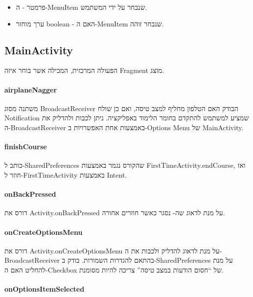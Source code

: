 \begin{itemize}
  \item פרמטר  - ה-MenuItem שנבחר על ידי המשתמש.
  \item ערך מוחזר boolean - האם ה-MenuItem שנבחר זוהה.
\end{itemize}

\subsection*{MainActivity}

הפעולה המרכזית, המכילה  אשר בוחר איזה Fragment מוצג.

\paragraph{airplaneNagger}

משתנה מסוג BroadcastReceiver הבודק האם הטלפון מחליף למצב טיסה,
ואם כן שולח Notification שמציע למשתמש להתקדם בחומר הלימוד באפליקציה.
ניתן לכבות ולהדליק את ה-BroadcastReceiver באמצעות אחת האפשרויות ב-Options Menu של MainActivity.

\paragraph{finishCourse}

כותב ל-SharedPreferences שהקורס נגמר באמצעות FirstTimeActivity.endCourse,
ואז חוזר ל-FirstTimeActivity באמצעות Intent.

\paragraph{onBackPressed}

דורס את Activity.onBackPressed על מנת לדאוג שה- נסגר כאשר חוזרים אחורה.

\paragraph{onCreateOptionsMenu}

דורס את Activity.onCreateOptionsMenu על מנת לדאוג להדליק ולכבות את ה-BroadcastReceiver בהתאם להגדרות השמורות.
בודק ב-SharedPreferences על מנת להחליט האם ה-Checkbox של ``חסום הודעות במצב טיסה'' צריכה להיות מסומנת.

\paragraph{onOptionsItemSelected}

